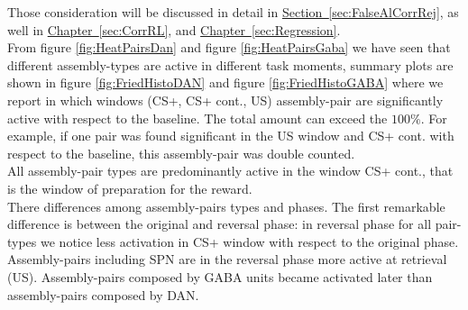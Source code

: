Those consideration will be discussed in detail in \hyperref[sec:FalseAlCorrRej]{Section~\ref*{sec:FalseAlCorrRej}}, as well in \hyperref[sec:CorrRL]{Chapter~\ref*{sec:CorrRL}}, and \hyperref[sec:Regression]{Chapter~\ref*{sec:Regression}}.\\From figure \ref{fig:HeatPairsDan} and figure \ref{fig:HeatPairsGaba} we have seen that different assembly-types are active in different task moments, summary plots are shown in figure  \ref{fig:FriedHistoDAN} and figure \ref{fig:FriedHistoGABA} where we report in which windows (CS+, CS+ cont., US) assembly-pair are significantly active with respect to the baseline. The total amount can exceed the $100\%$. For example, if one pair was found significant in the US window and CS+ cont. with respect to the baseline, this assembly-pair was double counted.\\All assembly-pair types are predominantly active in the window CS+ cont., that is the window of preparation for the reward.\\There differences among assembly-pairs types and phases. The first remarkable difference is between the original and reversal phase: in reversal phase for all pair-types we notice less activation in CS+ window with respect to the original phase. Assembly-pairs including SPN are in the reversal phase more active at retrieval (US). Assembly-pairs composed by GABA units became activated later than assembly-pairs composed by DAN.

